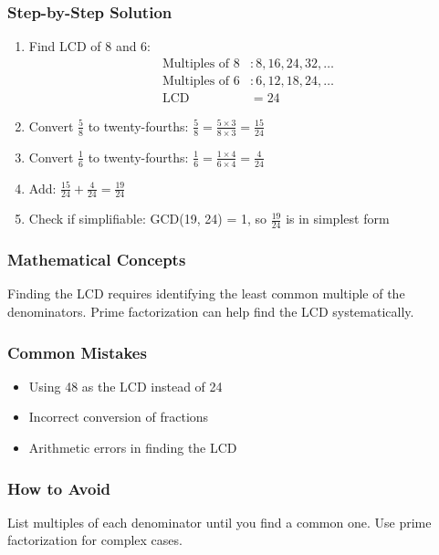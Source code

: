 \documentclass[12pt,a4paper]{article}
\begin{document}
\subsubsection*{Step-by-Step Solution}
\begin{enumerate}
    \item Find LCD of 8 and 6:
    \begin{align*}
        \text{Multiples of } 8 &: 8, 16, 24, 32, \ldots \\
        \text{Multiples of } 6 &: 6, 12, 18, 24, \ldots \\
        \text{LCD} &= 24
    \end{align*}
    \item Convert $\frac{5}{8}$ to twenty-fourths: $\frac{5}{8} = \frac{5 \times 3}{8 \times 3} = \frac{15}{24}$
    \item Convert $\frac{1}{6}$ to twenty-fourths: $\frac{1}{6} = \frac{1 \times 4}{6 \times 4} = \frac{4}{24}$
    \item Add: $\frac{15}{24} + \frac{4}{24} = \frac{19}{24}$
    \item Check if simplifiable: GCD(19, 24) = 1, so $\frac{19}{24}$ is in simplest form
\end{enumerate}

\subsubsection*{Mathematical Concepts}
Finding the LCD requires identifying the least common multiple of the denominators. Prime factorization can help find the LCD systematically.

\subsubsection*{Common Mistakes}
\begin{itemize}
    \item Using 48 as the LCD instead of 24
    \item Incorrect conversion of fractions
    \item Arithmetic errors in finding the LCD
\end{itemize}

\subsubsection*{How to Avoid}
List multiples of each denominator until you find a common one. Use prime factorization for complex cases.
\end{document}
